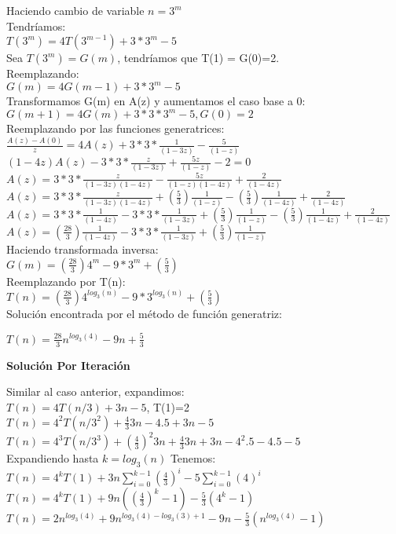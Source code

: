 \documentclass{article}
\begin{document}
\begin{enumerate}[label=\textbf{\alph*.}]
  Haciendo cambio de variable $n=3^m$\\
  Tendríamos:\\
  $T(3^m)=4T(3^{m-1})+3*3^m-5$\\
  Sea $T(3^m) = G(m)$, tendríamos que T(1) = G(0)=2.\\
  Reemplazando:\\
  $G(m)=4G(m-1)+3*3^m-5$\\
  Transformamos G(m) en A(z) y aumentamos el caso base a 0:\\
  $G(m+1)=4G(m)+3*3*3^{m}-5, G(0)=2$\\
  Reemplazando por las funciones generatrices:\\
  $\frac{A(z) - A(0)}{z} = 4A(z) + 3*3*\frac{1}{(1-3z)} -\frac{5}{(1-z)}$\\
  $(1-4z)A(z) - 3*3*\frac{z}{(1-3z)} + \frac{5z}{(1-z)} - 2=0$\\
  $A(z) = 3*3*\frac{z}{(1-3z)(1-4z)} - \frac{5z}{(1-z)(1-4z)} + \frac{2}{(1-4z)}$\\
  $A(z) = 3*3*\frac{z}{(1-3z)(1-4z)} + (\frac{5}{3})\frac{1}{(1-z)} - (\frac{5}{3})\frac{1}{(1-4z)} + \frac{2}{(1-4z)}$\\
  $A(z) = 3*3*\frac{1}{(1-4z)} - 3*3*\frac{1}{(1-3z)} + (\frac{5}{3})\frac{1}{(1-z)} - (\frac{5}{3})\frac{1}{(1-4z)} + \frac{2}{(1-4z)}$\\
  $A(z) = (\frac{28}{3})\frac{1}{(1-4z)} - 3*3*\frac{1}{(1-3z)} + (\frac{5}{3})\frac{1}{(1-z)}$\\
  Haciendo transformada inversa:\\
  $G(m) = (\frac{28}{3})4^m - 9*3^m + (\frac{5}{3})$\\
  Reemplazando por T(n):\\
  $T(n) = (\frac{28}{3})4^{log_3(n)} - 9*3^{log_3(n)} + (\frac{5}{3})$\\
  
  Soluci\'on encontrada por el m\'etodo de función generatriz:
  \begin{center}
  	$T(n) =  \frac{28}{3}n^{log_3(4)} - 9n  + \frac{5}{3} $\\
  \end{center}
  
  \textbf{Soluci\'on Por Iteraci\'on}
  
  Similar al caso anterior, expandimos:\\
  $T(n) = 4 T(n/3) + 3n - 5$, T(1)=2\\
  $T(n) = 4^2 T(n/3^2) + \frac{4}{3} 3n - 4 . 5  + 3n - 5$\\
  $T(n) = 4^3 T(n/3^3) + (\frac{4}{3})^2 3n + \frac{4}{3} 3n + 3n -4^2 . 5 - 4 . 5 - 5$\\
  Expandiendo hasta $k = log_3 (n)$ Tenemos:\\
  $T(n) = 4^k T(1) +  3n\sum_{i=0}^{k-1} (\frac{4}{3})^i - 5\sum_{i=0}^{k-1} (4)^i $\\ 
  $T(n) = 4^k T(1) +  9n ((\frac{4}{3})^k - 1)  - \frac{5}{3}(4^k - 1) $\\
  $T(n) = 2 n^{log_3(4)} +  9 n^{log_3(4) - log_3(3) + 1} - 9n  - \frac{5}{3}(n^{log_3(4)} - 1) $\\
  

\end{enumerate}
\end{document}
